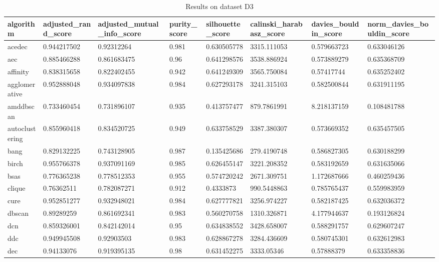 \begin{table}[H]
\centering
\caption{Results on dataset D3}
\label{tab:params:D3}
\begin{tabular}{|l|l|l|l|l|l|l|l|}
\hline
algorithm & adjusted\_rand\_score & adjusted\_mutual\_info\_score & purity\_score & silhouette\_score & calinski\_harabasz\_score & davies\_bouldin\_score & norm\_davies\_bouldin\_score \\
\hline
acedec & 0.944217502 & 0.92312264 & 0.981 & 0.630505778 & 3315.111053 & 0.579663723 & 0.633046126 \\
\hline
aec & 0.885466288 & 0.861683475 & 0.96 & 0.641298576 & 3538.886924 & 0.573889279 & 0.635368709 \\
\hline
affinity & 0.838315658 & 0.822402455 & 0.942 & 0.641249309 & 3565.750084 & 0.57417744 & 0.635252402 \\
\hline
agglomerative & 0.952888048 & 0.934097838 & 0.984 & 0.627293178 & 3241.315103 & 0.582500844 & 0.631911195 \\
\hline
amddbscan & 0.733460454 & 0.731896107 & 0.935 & 0.413757477 & 879.7861991 & 8.218137159 & 0.108481788 \\
\hline
autoclustering & 0.855960418 & 0.834520725 & 0.949 & 0.633758529 & 3387.380307 & 0.573669352 & 0.635457505 \\
\hline
bang & 0.829132225 & 0.743128905 & 0.987 & 0.135425686 & 279.4190748 & 0.586827305 & 0.630188299 \\
\hline
birch & 0.955766378 & 0.937091169 & 0.985 & 0.626455147 & 3221.208352 & 0.583192659 & 0.631635066 \\
\hline
bsas & 0.776365238 & 0.778512353 & 0.955 & 0.574720242 & 2671.309751 & 1.172687666 & 0.460259436 \\
\hline
clique & 0.76362511 & 0.782087271 & 0.912 & 0.4333873 & 990.5448863 & 0.785765437 & 0.559983959 \\
\hline
cure & 0.952851277 & 0.932948021 & 0.984 & 0.627777821 & 3256.974227 & 0.582187425 & 0.632036372 \\
\hline
dbscan & 0.89289259 & 0.861692341 & 0.983 & 0.560270758 & 1310.326871 & 4.177944637 & 0.193126824 \\
\hline
dcn & 0.859326001 & 0.842142014 & 0.95 & 0.634838552 & 3428.658007 & 0.588291757 & 0.629607247 \\
\hline
ddc & 0.949945508 & 0.92903503 & 0.983 & 0.628867278 & 3284.436609 & 0.580745301 & 0.632612983 \\
\hline
dec & 0.94133076 & 0.919395135 & 0.98 & 0.631452275 & 3333.05346 & 0.57888379 & 0.633358836 \\

\end{tabular}
\end{table}
